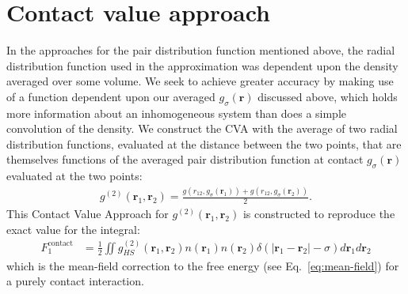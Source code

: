 \documentclass[letterpaper,twocolumn,amsmath,amssymb,pre,aps,10pt]{revtex4-1}
\newcommand{\cyan}[1]{{\bf \color{cyan} #1}}
\newcommand{\rr}{\textbf{r}}
\newcommand{\jeffsays}[1]{{\color{red} [\cyan{Jeff:} \emph{#1}]}}
\begin{document}



\section{Contact value approach}
In the approaches for the pair distribution function
mentioned above, the radial distribution function used in the
approximation was dependent upon the density averaged over some
volume.  We seek to achieve greater accuracy by making use of a
function dependent upon our averaged $g_{\sigma}(\rr)$ discussed
above, which holds more information about an inhomogeneous system than
does a simple convolution of the density.
%
We construct the CVA with the average of two radial distribution
functions, evaluated at the distance between the two points, that are
themselves functions of the averaged pair distribution function at contact
$g_{\sigma}(\rr)$ evaluated at the two points:
%
\begin{align}
  g^{(2)}(\rr_1,\rr_2) = \frac{g(r_{12}, g_\sigma(\rr_1)) +
    g(r_{12}, g_\sigma(\rr_2))}{2}. \label{eq:g2-our-mean}
\end{align}
This Contact Value Approach for $g^{(2)}(\rr_1,\rr_2)$ is
constructed to reproduce the exact value for the integral:
\begin{align}
  F_1^{\text{contact}} &= \tfrac12 \iint
  g^{(2)}_{HS}(\rr_1,\rr_2)n(\rr_1)n(\rr_2)\delta(|\rr_1-\rr_2|-\sigma)
  d\rr_1d\rr_2
  \label{eq:mean-field-contact}
\end{align}
which is the mean-field correction to the free energy (see
Eq.~\ref{eq:mean-field}) for a purely contact interaction.
\end{document}
